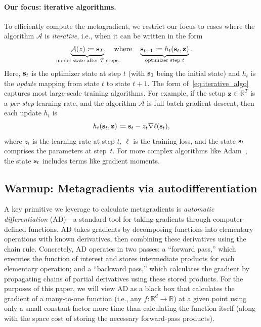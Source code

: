 \paragraph{Our focus: iterative algorithms.}  
To efficiently compute the metagradient, 
we restrict our focus to cases where the algorithm $\mathcal{A}$ is 
{\em iterative}, i.e., when it can be written in the form
\begin{align}
  \label{eq:iterative_algo}
  \underbrace{\mathcal{A}(z) \coloneqq \st{T}}_{\mathclap{\text{model state after $T$ steps}}}, 
  \quad \text{where} \quad \underbrace{\st{t+1} := h_t(\st{t}, \mathbf{z})}_{\mathclap{\text{optimizer step $t$}}}.
\end{align}
Here, $\mathbf{s}_{t}$ is the optimizer state at step $t$
(with $\mathbf{s}_{0}$ being the initial state)
and $h_t$ is the {\em update} mapping from state $t$ to state $t+1$.
The form of~\eqref{eq:iterative_algo} captures most large-scale training algorithms. 
For example, if the setup $\mathbf{z} \in \mathbb{R}^T$ is a \textit{per-step} learning rate, 
and the algorithm $\mathcal{A}$ is 
full batch gradient descent, then each update $h_t$ is
$$
  h_t(\mathbf{s}_{t}, \mathbf{z}) \coloneqq \mathbf{s}_{t} - z_t \nabla \ell(\mathbf{s}_{t}),
$$
where $z_t$ is the learning rate at step $t$, 
$\ell$ is the training loss, and 
the state $\mathbf{s}_{t}$ comprises the parameters at step~$t$.
For more complex algorithms like
Adam~\citep{kingma2015adam}, the state $\mathbf{s}_{t}$ includes
terms like gradient moments.

\subsection{Warmup: Metagradients via autodifferentiation}
A key primitive we leverage to calculate metagradients is
{\em automatic differentiation} (AD)---a standard tool for taking 
gradients through computer-defined functions.
AD takes gradients 
by decomposing functions into elementary operations 
with known derivatives, then combining these derivatives using the chain rule.
Concretely, AD operates in two passes: a ``forward pass,'' 
which executes the function of interest and stores intermediate products 
for {each} elementary operation; and a ``backward pass,''
which calculates the gradient by propagating chains of
partial derivatives using these stored products. For the purposes of this paper, 
we will view AD as a black box that calculates the gradient of a many-to-one function 
(i.e., any $f: \mathbb{R}^d \to \mathbb{R}$)
at a given point using only a small constant factor more time than calculating the
function itself (along with the space cost of storing the 
necessary forward-pass products).

